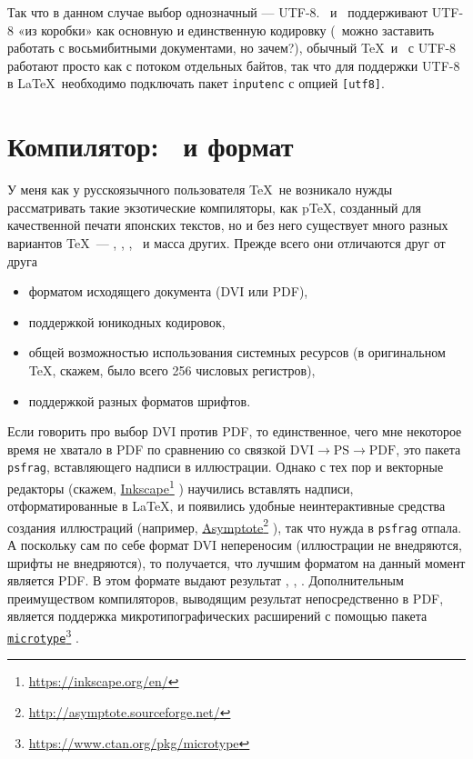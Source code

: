 \documentclass[a4paper,12pt]{article}
\let\orighref=\href
\renewcommand\href[2]{%
  \orighref{#1}{#2}\footnote{\url{#1}}%
}
\begin{document}
Так что в данном случае выбор однозначный --- UTF-8. \LuaTeX\ и \XeTeX\ поддерживают
UTF-8 «из коробки» как основную и единственную кодировку (\LuaLaTeX\ можно
заставить работать с восьмибитными документами, но зачем?), обычный \TeX\
и \pdfTeX\ с UTF-8 работают просто как с потоком отдельных байтов, так что
для поддержки UTF-8 в \LaTeX\ необходимо подключать пакет \texttt{inputenc}
с опцией \texttt{[utf8]}.

\section{Компилятор: \LuaTeX\ и формат \LuaLaTeX}
У меня как у русскоязычного пользователя \TeX\ не возникало нужды рассматривать
такие экзотические компиляторы, как p\TeX, созданный для качественной печати японских
текстов, но и без него существует много разных вариантов \TeX\ --- \eTeX, \pdfTeX,
\XeTeX, \LuaTeX\ и масса других. Прежде всего они отличаются
друг от друга
\begin{itemize}
\item форматом исходящего документа (DVI или PDF),
\item поддержкой юникодных кодировок,
\item общей возможностью использования системных ресурсов (в оригинальном \TeX,
скажем, было всего 256 числовых регистров),
\item поддержкой разных форматов шрифтов.
\end{itemize}

Если говорить про выбор DVI против PDF, то единственное, чего мне некоторое время
не хватало в PDF по сравнению со связкой $\text{DVI}\to\text{PS}\to\text{PDF}$,
это пакета \texttt{psfrag}, вставляющего надписи в иллюстрации. Однако с тех
пор и векторные редакторы (скажем, \href{https://inkscape.org/en/}{Inkscape})
научились вставлять надписи,
отформатированные в \LaTeX, и появились удобные неинтерактивные средства создания
иллюстраций (например, \href{http://asymptote.sourceforge.net/}{Asymptote}),
так что нужда в \texttt{psfrag}
отпала. А поскольку сам по себе формат DVI непереносим (иллюстрации не
внедряются, шрифты не внедряются), то получается, что лучшим форматом на данный
момент является PDF. В этом формате выдают результат \pdfTeX, \XeTeX, \LuaTeX.
Дополнительным преимуществом компиляторов, выводящим результат непосредственно в PDF,
является поддержка микротипографических расширений с помощью пакета
\href{https://www.ctan.org/pkg/microtype}{\texttt{microtype}}.
\end{document}

